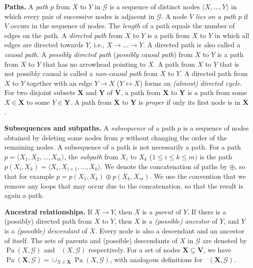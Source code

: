 \documentclass[]{article}
\DeclareMathOperator{\PossPossDe}{(Poss)De}
\DeclareMathOperator{\Pa}{Pa}
\theoremstyle{definition}
\theoremstyle{remark}
\newcommand{\g}[1][G]{\mathcal{#1}}
\begin{document}
\textbf{Paths.} A \textit{path} $p$ from $X$ to $Y$ in $\g$ is a sequence of distinct nodes $\langle X, \dots,Y \rangle$ in which every pair of successive nodes is adjacent in $\g$. A node $V$ \emph{lies on a path} $p$ if $V$ occurs in the sequence of nodes.
The \textit{length} of a path equals the number of edges on the path.  A \textit{directed path} from $X$ to $Y$ is a path from $X$ to $Y$ in which all edges are directed towards $Y$, i.e., $X \to \dots\to Y$. A directed path is also called a \textit{causal path}. A \textit{possibly directed path} (\textit{possibly causal path}) from $X$ to $Y$ is a path from $X$ to $Y$ that has no arrowhead pointing to $X$. A path from $X$ to $Y$ that is not possibly causal is called a \textit{non-causal path} from $X$ to $Y$. A directed path from $X$ to $Y$ together with an edge $Y\to X$ ($Y \leftrightarrow X$) forms an \emph{(almost) directed cycle}.
For two disjoint subsets $\mathbf{X}$ and $\mathbf{Y}$ of $\mathbf{V}$, a path from $\mathbf{X}$ to $\mathbf{Y}$
is a path from some $X \in \mathbf{X}$ to some $Y \in \mathbf{Y}$.
A path from $\mathbf{X}$ to $\mathbf{Y}$ is \textit{proper} if only its first node is in $\mathbf{X}$.

\textbf{Subsequences and subpaths.} A \textit{subsequence} of a path $p$ is a sequence of nodes obtained by deleting some nodes from $p$ without changing the order of the remaining nodes. A subsequence of a path is not necessarily a path. For a path $p = \langle X_1,X_2,\dots,X_m \rangle$, the \textit{subpath} from $X_i$ to $X_k$ ($1\le i\le k\le m)$ is the path $p(X_i,X_k) = \langle X_i,X_{i+1},\dots,X_{k}\rangle$. We denote the concatenation of paths by $\oplus$, so
that for example $p = p(X_1,X_{k}) \oplus p(X_{k},X_{m})$. We use the convention that we remove any loops that may occur due to the concatenation, so that the result is again a path.

\textbf{Ancestral relationships.} If $X\to Y$, then $X$ is a \textit{parent} of $Y$. If there is a (possibly) directed path from $X$ to $Y$, then $X$ is a \textit{(possible) ancestor} of $Y$, and $Y$ is a \textit{(possible) descendant} of $X$. Every node is also a descendant and an ancestor of itself.  The sets of parents and (possible) descendants of $X$ in $\g$ are denoted by $\Pa(X,\g)$ and $\PossPossDe(X,\g)$ respectively. For a set of nodes $\mathbf{X} \subseteq \mathbf{V}$, we have $\Pa(\mathbf{X},\g) = \cup_{X \in \mathbf{X}} \Pa(X,\g)$, with analogous definitions for $\PossPossDe(\mathbf{X},\g)$.
\end{document}
